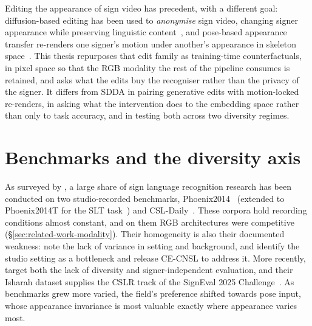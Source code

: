 Editing the appearance of sign video has precedent, with a different
goal: diffusion-based editing has been used to \emph{anonymise} sign
video, changing signer appearance while preserving linguistic
content~\cite{xiaDiffusionModelsSign2024}, and pose-based appearance
transfer re-renders one signer's motion under another's appearance in
skeleton space~\cite{moryossefPoseBasedSignLanguage2025}. This thesis
repurposes that edit family as training-time counterfactuals, in pixel
space so that the RGB modality the rest of the pipeline consumes is
retained, and asks what the edits buy the recogniser rather than the
privacy of the signer. It differs from SDDA in pairing generative edits
with motion-locked re-renders, in asking what the intervention does to
the embedding space rather than only to task accuracy, and in testing
both across two diversity regimes.

\section{Benchmarks and the diversity axis}
\label{sec:related-work-benchmarks}
As surveyed by \citet{kalinowskiMachineLearningSign2026}, a large share of
sign language recognition research has been conducted on two
studio-recorded benchmarks, Phoenix2014~\cite{kollerContinuousSignLanguage2015}
(extended to Phoenix2014T for the SLT task~\cite{camgozNeuralSignLanguage2018})
and CSL-Daily~\cite{CSL-daily}. These corpora hold recording conditions
almost constant, and on them RGB architectures were competitive
(\S\ref{sec:related-work-modality}). Their homogeneity is also their
documented weakness: \citet{jangSigningOutsideStudio2022} note the lack of
variance in setting and background, and \citet{CE-CNSL} identify the
studio setting as a bottleneck and release CE-CNSL to address it. More
recently, \citet{alyamiIsharahLargeScaleMultiScene2026b} target both the
lack of diversity and signer-independent evaluation, and their Isharah
dataset supplies the CSLR track of the SignEval 2025
Challenge~\cite{luqmanSignEval2025Challenge2025a}. As benchmarks grew more
varied, the field's preference shifted towards pose input, whose
appearance invariance is most valuable exactly where appearance varies
most.

